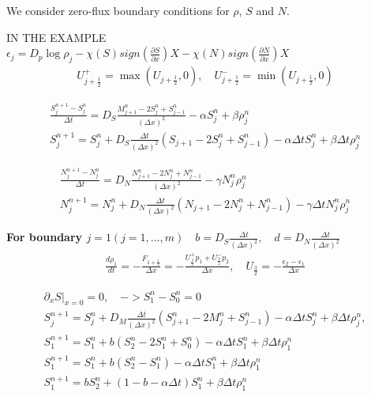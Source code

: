 \documentclass[11pt,twoside]{article}
\begin{document}
We consider zero-flux boundary conditions for $\rho$, $S$ and $N$.








\iffalse
IN THE EXAMPLE\\
$\epsilon_j=D_p \log \rho_j-\chi(S) sign(\frac{\partial S}{\partial x})X-\chi(N) sign(\frac{\partial N}{\partial x})X$
\begin{eqnarray}
U^+_{j+\frac{1}{2}}=\max(U_{j+\frac{1}{2}},0), \quad U^-_{j+\frac{1}{2}}=\min (U_{j+\frac{1}{2}},0)
\end{eqnarray}

\begin{eqnarray}
\frac{S_j^{n+1}-S_j^n}{\Delta t}=D_S\frac{M_{j+1}^n-2S_j^n+S_{j-1}^n}{(\Delta x)^2}-\alpha S_j^n+\beta \rho_j^n\\
S_j^{n+1}=S_j^n+D_S \frac{\Delta t} {(\Delta x)^2}(S_{j+1}-2S_j^n+S_{j-1}^n)-\alpha \Delta t S_j^n+\beta \Delta t \rho_j^n
\end{eqnarray}


\begin{eqnarray}
\frac{N_j^{n+1}-N_j^n}{\Delta t}=D_N\frac{N_{j+1}^n-2N_j^n+N_{j-1}^n}{(\Delta x)^2}-\gamma N_j^n \rho_j^n\\
N_j^{n+1}=N_j^n+D_N \frac{\Delta t} {(\Delta x)^2}(N_{j+1}-2N_j^n+N_{j-1}^n)-\gamma \Delta t N_j^n \rho_j^n
\end{eqnarray}

\textbf{ For boundary $ j=1(j=1,...,m) \quad b=D_S \frac{\Delta t} {(\Delta x)^2}, \quad d=D_N \frac{\Delta t} {(\Delta x)^2}$}
\begin{eqnarray}
\frac{d\rho_1}{dt}=-\frac{F_{1+\frac{1}{2}}}{\Delta x}=-\frac{U^+_{\frac{3}{2}}p_1+U^-_{\frac{3}{2}}p_2 }{\Delta x}, \quad U_{\frac{3}{2}}=-\frac{\epsilon_2-\epsilon_1}{\Delta x}
\end{eqnarray}

 
\begin{eqnarray}
\partial_x S |_{x=0}= 0, \quad -> S^n_1-S^n_0=0\\
S_j^{n+1}=S_j^n+D_M \frac{\Delta t} {(\Delta x)^2}(S^n_{j+1}-2M_j^n+S_{j-1}^n)-\alpha \Delta t S_j^n+\beta \Delta t \rho_j^n, \\
S_1^{n+1}=S_1^n+b(S^n_{2}-2S_1^n+S_{0}^n)-\alpha \Delta t S_1^n+\beta \Delta t \rho_1^n\\
S_1^{n+1}=S_1^n+b(S^n_{2}-S_1^n)-\alpha \Delta t S_1^n+\beta \Delta t \rho_1^n\\
S_1^{n+1}=bS^n_2+(1-b-\alpha \Delta t)S_1^n+\beta \Delta t \rho_1^n
\end{eqnarray}
\end{document}
